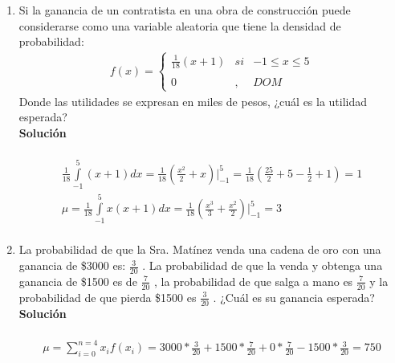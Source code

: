 \begin{enumerate}
    \item Si la ganancia de un contratista en una obra de construcción puede considerarse como una variable aleatoria que tiene la densidad de probabilidad: \\
    \begin{align*}
    f(x)= \left\{ \begin{array}{lcc}
    \frac{1}{18}(x + 1) &   si  & -1 \leq x \leq 5 \\
    \\ 0 &  ,  & DOM
    \end{array}
    \right.
    \end{align*}
    Donde las utilidades se expresan en miles de pesos, ¿cuál es la utilidad esperada?
    \\\textbf{Solución}
    \\ \\
    \begin{gather*}
    \frac{1}{18} \int \limits_{-1}^{5} (x+1) dx = \frac{1}{18}(\frac{x^2}{2} + x) \bigg\vert_{-1}^5 = \frac{1}{18}(\frac{25}{2} + 5 - \frac{1}{2} + 1) = 1 \\
    \mu = \frac{1}{18} \int \limits_{-1}^{5} x(x+1) dx = \frac{1}{18}(\frac{x^3}{3} + \frac{x^2}{2}) \bigg\vert_{-1}^5 = 3 \\
    \end{gather*}
    
    \item La probabilidad de que la Sra. Matínez venda una cadena de oro con una ganancia de \$3000 es: $ \frac{3}{20} $ . La probabilidad de que la venda y obtenga una ganancia de \$1500 es de $ \frac{7}{20} $ , la probabilidad de que salga a mano es $ \frac{7}{20} $ y la probabilidad de que pierda \$1500 es $ \frac{3}{20} $ . ¿Cuál es su ganancia esperada?
    \\\textbf{Solución}
    \\ \\
    \begin{gather*}
    \mu = \sum_{i = 0}^{n = 4} x_{i}f(x_{i}) = 3000*\frac{3}{20} + 1500*\frac{7}{20} + 0*\frac{7}{20} - 1500*\frac{3}{20} = 750 \\
    \end{gather*}
    

\end{enumerate}
